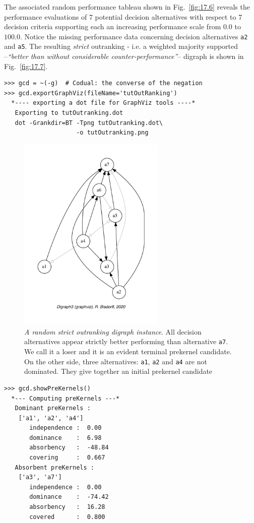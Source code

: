 The associated random performance tableau shown in Fig.~\vref{fig:17.6} reveals the performance evaluations of 7 potential decision alternatives with respect to 7 decision criteria supporting each an increasing performance scale from $0.0$ to $100.0$. Notice the missing performance data concerning decision alternatives \texttt{a2} and \texttt{a5}. The resulting \emph{strict} outranking - i.e. a weighted majority supported --\emph{``better than without considerable counter-performance''}-- digraph is shown in Fig.~\vref{fig:17.7}.
\begin{lstlisting}
>>> gcd = ~(-g)  # Codual: the converse of the negation
>>> gcd.exportGraphViz(fileName='tutOutRanking')
  *---- exporting a dot file for GraphViz tools ----*
   Exporting to tutOutranking.dot
   dot -Grankdir=BT -Tpng tutOutranking.dot\
                    -o tutOutranking.png\end{lstlisting}
\begin{figure}[ht]
\sidecaption[t]
\includegraphics[width=7cm]{Figures/17-7-tutOutranking.pdf}
\caption[A random strict outranking digraph instance]{\emph{A random strict outranking digraph instance}. All decision alternatives appear strictly better performing than alternative \texttt{a7}. We call it a \Condorcet loser and it is an evident terminal prekernel candidate. On the other side, three alternatives: \texttt{a1}, \texttt{a2} and \texttt{a4} are not dominated. They give together an initial prekernel candidate}
\label{fig:17.7}       %
\end{figure}

\begin{lstlisting}[caption={Computing the prekernels of the strict outranking digraph \texttt{gcd}},label=list:17.13]
>>> gcd.showPreKernels()
  *--- Computing preKernels ---*
   Dominant preKernels :
    ['a1', 'a2', 'a4']
       independence :  0.00
       dominance    :  6.98
       absorbency   :  -48.84
       covering     :  0.667
   Absorbent preKernels :
    ['a3', 'a7']
       independence :  0.00
       dominance    :  -74.42
       absorbency   :  16.28
       covered      :  0.800
\end{lstlisting}

